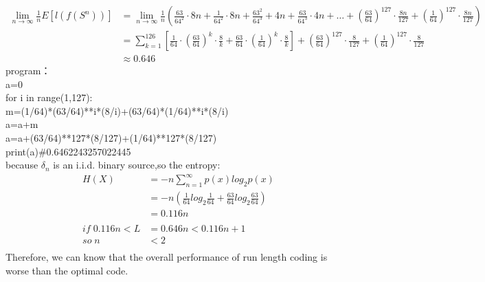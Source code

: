 \documentclass[UTF8,oneside]{article}
\begin{document}
\begin{equation}
\begin{aligned}
\lim _{n \rightarrow \infty} \frac{1}{n} E\left[l\left(f\left(S^{n}\right)\right)\right] &=\lim _{n \rightarrow \infty} \frac{1}{n}\left(\frac{63}{64^{2}} \cdot 8 n+\frac{1}{64^{2}} \cdot 8 n+\frac{63^{2}}{64^{3}}+4 n+\frac{63}{64^{3}} \cdot 4 n+\ldots+\left(\frac{63}{64}\right)^{127} \cdot \frac{8 n}{127}+\left(\frac{1}{64}\right)^{127} \cdot \frac{8 n}{127}\right) \\
&=\sum\nolimits_{k=1}^{126}\left[\frac{1}{64} \cdot\left(\frac{63}{64}\right)^{k} \cdot \frac{8}{k}+\frac{63}{64} \cdot\left(\frac{1}{64}\right)^{k} \cdot \frac{8}{k}\right]+\left(\frac{63}{64}\right)^{127} \cdot \frac{8}{127}+\left(\frac{1}{64}\right)^{127} \cdot \frac{8}{127}\\
&\approx 0.646
\end{aligned}
\end{equation}
program：\\
a=0\\
\quad for i in range(1,127):\\
\qquad    m=(1/64)*(63/64)**i*(8/i)+(63/64)*(1/64)**i*(8/i)\\
\qquad    a=a+m\\
a=a+(63/64)**127*(8/127)+(1/64)**127*(8/127)\\
print(a)\#0.6462243257022445\\
because $\delta_n$  is an i.i.d. binary source,so the entropy:\\
\begin{align*}
H(X) &=-n\sum_{n=1}^\infty p(x)log_{2}p(x) \\
&=-n(\frac{1}{64}log_{2}\frac{1}{64}+\frac{63}{64}log_{2}\frac{63}{64})\\
&=0.116n\\
\\
if\;0.116n<L&=0.646n<0.116n+1\\
so\;n&<2\\
\end{align*}
Therefore, we can know that the overall performance of run length coding is worse than the optimal code.
\end{document}

